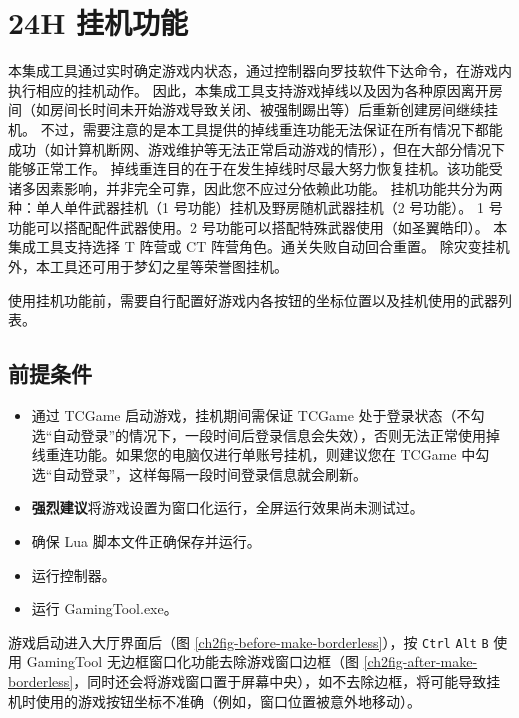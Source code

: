 \section{24H 挂机功能}

本集成工具通过实时确定游戏内状态，通过控制器向罗技软件下达命令，在游戏内执行相应的挂机动作。
因此，本集成工具支持游戏掉线以及因为各种原因离开房间（如房间长时间未开始游戏导致关闭、被强制踢出等）后重新创建房间继续挂机。
不过，需要注意的是本工具提供的掉线重连功能无法保证在所有情况下都能成功（如计算机断网、游戏维护等无法正常启动游戏的情形），但在大部分情况下能够正常工作。
掉线重连目的在于在发生掉线时尽最大努力恢复挂机。该功能受诸多因素影响，并非完全可靠，因此您不应过分依赖此功能。
挂机功能共分为两种：单人单件武器挂机（1 号功能）挂机及野房随机武器挂机（2 号功能）。
1 号功能可以搭配配件武器使用。2 号功能可以搭配特殊武器使用（如圣翼皓印）。
本集成工具支持选择 T 阵营或 CT 阵营角色。通关失败自动回合重置。
除灾变挂机外，本工具还可用于梦幻之星等荣誉图挂机。

使用挂机功能前，需要自行配置好游戏内各按钮的坐标位置以及挂机使用的武器列表。

\subsection{前提条件}

\begin{itemize}

\item 通过 TCGame 启动游戏，挂机期间需保证 TCGame 处于登录状态（不勾选“自动登录”的情况下，一段时间后登录信息会失效），否则无法正常使用掉线重连功能。如果您的电脑仅进行单账号挂机，则建议您在 TCGame 中勾选“自动登录”，这样每隔一段时间登录信息就会刷新。

\item \textbf{\color{red}强烈建议}将游戏设置为窗口化运行，全屏运行效果尚未测试过。

\item 确保 Lua 脚本文件正确保存并运行。

\item 运行控制器。

\item 运行 GamingTool.exe。

\end{itemize}

游戏启动进入大厅界面后（图 \ref{ch2fig-before-make-borderless}），按 \lstinline{Ctrl} \lstinline{Alt} \lstinline{B} 使用 GamingTool 无边框窗口化功能去除游戏窗口边框（图 \ref{ch2fig-after-make-borderless}，同时还会将游戏窗口置于屏幕中央），如不去除边框，将可能导致挂机时使用的游戏按钮坐标不准确（例如，窗口位置被意外地移动）。

